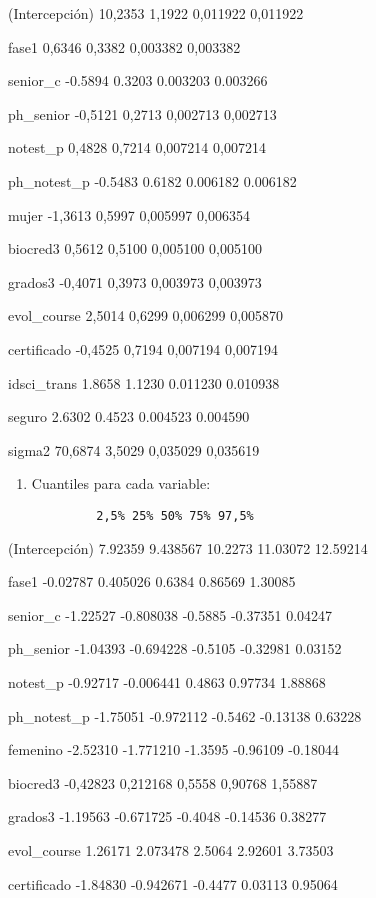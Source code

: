 \documentclass[
]{book}
\begin{document}
(Intercepción) 10,2353 1,1922 0,011922 0,011922

fase1 0,6346 0,3382 0,003382 0,003382

senior\_c -0.5894 0.3203 0.003203 0.003266

ph\_senior -0,5121 0,2713 0,002713 0,002713

notest\_p 0,4828 0,7214 0,007214 0,007214

ph\_notest\_p -0.5483 0.6182 0.006182 0.006182

mujer -1,3613 0,5997 0,005997 0,006354

biocred3 0,5612 0,5100 0,005100 0,005100

grados3 -0,4071 0,3973 0,003973 0,003973

evol\_course 2,5014 0,6299 0,006299 0,005870

certificado -0,4525 0,7194 0,007194 0,007194

idsci\_trans 1.8658 1.1230 0.011230 0.010938

seguro 2.6302 0.4523 0.004523 0.004590

sigma2 70,6874 3,5029 0,035029 0,035619

\begin{enumerate}
\def\labelenumi{\arabic{enumi}.}
\setcounter{enumi}{1}
\item
  Cuantiles para cada variable:

\begin{verbatim}
         2,5% 25% 50% 75% 97,5%
\end{verbatim}
\end{enumerate}

(Intercepción) 7.92359 9.438567 10.2273 11.03072 12.59214

fase1 -0.02787 0.405026 0.6384 0.86569 1.30085

senior\_c -1.22527 -0.808038 -0.5885 -0.37351 0.04247

ph\_senior -1.04393 -0.694228 -0.5105 -0.32981 0.03152

notest\_p -0.92717 -0.006441 0.4863 0.97734 1.88868

ph\_notest\_p -1.75051 -0.972112 -0.5462 -0.13138 0.63228

femenino -2.52310 -1.771210 -1.3595 -0.96109 -0.18044

biocred3 -0,42823 0,212168 0,5558 0,90768 1,55887

grados3 -1.19563 -0.671725 -0.4048 -0.14536 0.38277

evol\_course 1.26171 2.073478 2.5064 2.92601 3.73503

certificado -1.84830 -0.942671 -0.4477 0.03113 0.95064
\end{document}
